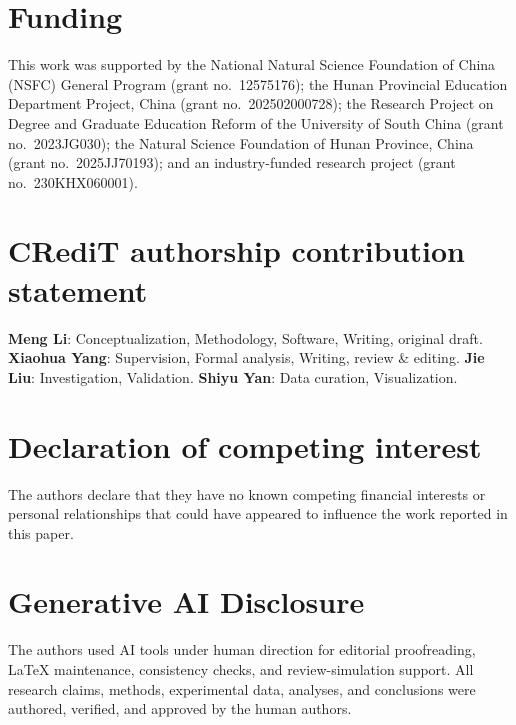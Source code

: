 \documentclass[review,12pt,authoryear]{elsarticle}
\begin{document}
\section*{Funding}

This work was supported by the National Natural Science Foundation of China (NSFC) General Program (grant no.\ 12575176); the Hunan Provincial Education Department Project, China (grant no.\ 202502000728); the Research Project on Degree and Graduate Education Reform of the University of South China (grant no.\ 2023JG030); the Natural Science Foundation of Hunan Province, China (grant no.\ 2025JJ70193); and an industry-funded research project (grant no.\ 230KHX060001).

\section*{CRediT authorship contribution statement}

\textbf{Meng Li}: Conceptualization, Methodology, Software, Writing, original draft. \textbf{Xiaohua Yang}: Supervision, Formal analysis, Writing, review \& editing. \textbf{Jie Liu}: Investigation, Validation. \textbf{Shiyu Yan}: Data curation, Visualization.

\section*{Declaration of competing interest}

The authors declare that they have no known competing financial interests or personal relationships that could have appeared to influence the work reported in this paper.

\section*{Generative AI Disclosure}

The authors used AI tools under human direction for editorial proofreading,
LaTeX maintenance, consistency checks, and review-simulation support. All
research claims, methods, experimental data, analyses, and conclusions were
authored, verified, and approved by the human authors.
\end{document}
